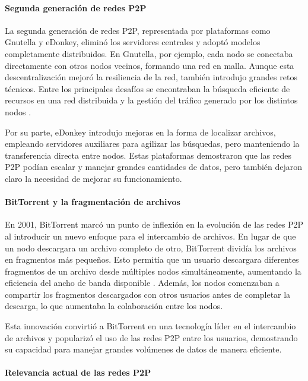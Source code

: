 \paragraph{Segunda generación de redes P2P}

La segunda generación de redes P2P, representada por plataformas como Gnutella y eDonkey, eliminó los servidores centrales y adoptó modelos completamente distribuidos.
En Gnutella, por ejemplo, cada nodo se conectaba directamente con otros nodos vecinos, formando una red en malla.
Aunque esta descentralización mejoró la resiliencia de la red, también introdujo grandes retos técnicos.
Entre los principales desafíos se encontraban la búsqueda eficiente de recursos en una red distribuida y la gestión del tráfico generado por los distintos nodos \cite{risson2006}.

Por su parte, eDonkey introdujo mejoras en la forma de localizar archivos, empleando servidores auxiliares para agilizar las búsquedas, pero manteniendo la transferencia directa entre nodos.
Estas plataformas demostraron que las redes P2P podían escalar y manejar grandes cantidades de datos, pero también dejaron claro la necesidad de mejorar su funcionamiento.

\paragraph{BitTorrent y la fragmentación de archivos}

En 2001, BitTorrent marcó un punto de inflexión en la evolución de las redes P2P al introducir un nuevo enfoque para el intercambio de archivos.
En lugar de que un nodo descargara un archivo completo de otro, BitTorrent dividía los archivos en fragmentos más pequeños.
Esto permitía que un usuario descargara diferentes fragmentos de un archivo desde múltiples nodos simultáneamente, aumentando la eficiencia del ancho de banda disponible \cite{cohen2003}.
Además, los nodos comenzaban a compartir los fragmentos descargados con otros usuarios antes de completar la descarga, lo que aumentaba la colaboración entre los nodos.

Esta innovación convirtió a BitTorrent en una tecnología líder en el intercambio de archivos y popularizó el uso de las redes P2P entre los usuarios,
demostrando su capacidad para manejar grandes volúmenes de datos de manera eficiente.

\paragraph{Relevancia actual de las redes P2P}

